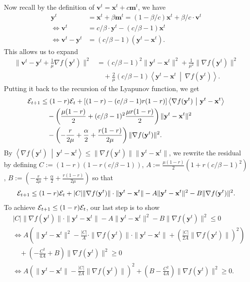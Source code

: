 \documentclass{article}
\theoremstyle{plain}
\theoremstyle{definition}
\theoremstyle{remark}
\def\bx{\mathbf{x}}
\def\by{\mathbf{y}}
\def\bm{\mathbf{m}}
\def\bv{\mathbf{v}}
\newcommand{\dotp}[2]{\left\langle{#1}\ \middle|\ {#2}\right\rangle}
\begin{document}
Now recall by the definition of $\bv^t = \bx^t + c\bm^t$, we have
\begin{align}
    \by^t &= \bx^t + \beta \bm^t = \left(1 - \beta/c\right) \bx^t + \beta/c \cdot \bv^t \\
    \Leftrightarrow \bv^t &= c/\beta \cdot \by^t - \left(c/\beta -1\right)\bx^t \\
    \Leftrightarrow \bv^t -\by^t &= \left(c/\beta - 1\right) (\by^t -\bx^t).    
\end{align}
This allows us to expand
\begin{align}
    \| \bv^t - \by^t + \frac{1}{\mu} \nabla f(\by^t) \|^2 &= \left(c/\beta - 1\right)^2 \| \by^t - \bx^t \|^2 + \frac{1}{\mu^2} \| \nabla f(\by^t)\|^2  \\
    &\quad + \frac{2}{\mu}\left(c/\beta - 1\right)\dotp{\by^t - \bx^t}{\nabla f(\by^t)}.
\end{align}
Putting it back to the recursion of the Lyapunov function, we get
\begin{align}
    {\cal E}_{t+1} &\leq (1-r){\cal E}_t + [(1-r) - (c/\beta - 1) r (1-r)]\dotp{\nabla f(\by^t)}{\by^t - \bx^t} \\
    &\quad -\left( \frac{\mu (1-r)}{2} + (c/\beta - 1)^2 \frac{\mu r(1-r)}{2}\right) \| \by^t - \bx^t\|^2\\
    &\quad  -\left(-\frac{r}{2\mu} + \frac{\alpha}{2} + \frac{r(1-r)}{2\mu} \right)\| \nabla f(\by^t) \|^2.
\end{align}
By $\dotp{\nabla f(\by^t)}{\by^t - \bx^t} \leq \|\nabla f(\by^t)\| \| \by^t - \bx^t\|$, we rewrite the residual by defining $C := (1-r)(1 - r(c/\beta - 1))$, $A:=\frac{\mu(1-r)}{2}(1 + r(c/\beta-1)^2)$, $B:=\left(-\frac{r}{2\mu} + \frac{\alpha}{2} + \frac{r(1-r)}{2\mu} \right)$ so that
\begin{align}
    {\cal E}_{t+1} \leq (1-r) {\cal E}_t + |C| \| \nabla f(\by^t) \| \cdot \| \by^t - \bx^t \| - A \| \by^t - \bx^t \|^2 - B \| \nabla f(\by^t) \|^2.
\end{align}
To achieve ${\cal E}_{t+1} \leq (1-r){\cal E}_t$, our last step is to show 
\begin{align}
     &|C| \| \nabla f(\by^t) \| \cdot \| \by^t - \bx^t \| - A \| \by^t - \bx^t \|^2 - B \| \nabla f(\by^t) \|^2 \leq 0 \\
     &\Leftrightarrow A\left( \| \by^t - \bx^t \|^2 - \frac{|C|}{A}  \cdot \| \nabla f(\by^t) \| \cdot \| \by^t - \bx^t \| + (\frac{|C|}{2A} \| \nabla f(\by^t) \|)^2 \right) \\
     &\quad + (- \frac{C^2}{4A}  + B ) \| \nabla f(\by^t) \|^2 \ge 0 \\
     &\Leftrightarrow A\left( \| \by^t - \bx^t \| - \frac{|C|}{2A}\| \nabla f(\by^t) \| \right)^2 + (B- \frac{C^2}{4A})  \| \nabla f(\by^t) \|^2 \ge 0.
\end{align}
\end{document}
